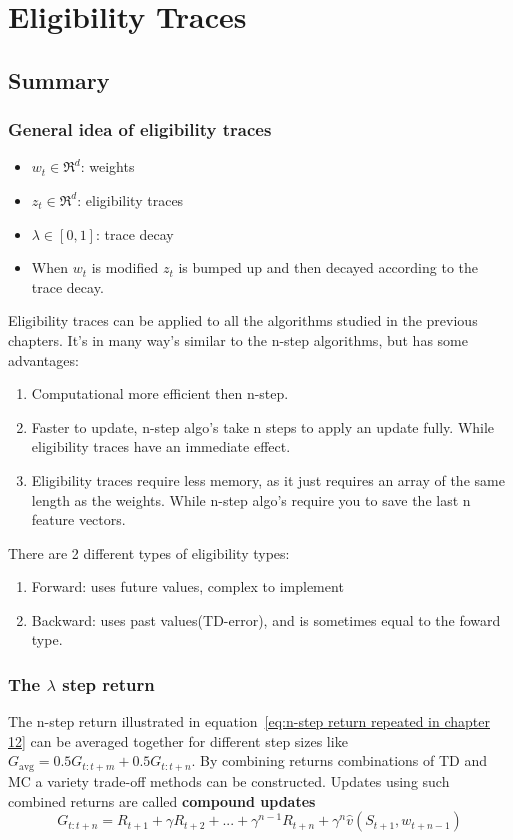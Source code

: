 \chapter{Eligibility Traces}

\section{Summary}

\subsection{General idea of eligibility traces}

\begin{itemize}
	\item $w_t \in \Re^d$: weights
	\item $z_t \in \Re^d$: eligibility traces
	\item $\lambda \in [0,1]$: trace decay 
	\item When $w_t$ is modified $z_t$ is bumped up and then decayed according to the trace decay.
\end{itemize}

Eligibility traces can be applied to all the algorithms studied in the previous chapters. It's in many way's similar to the n-step algorithms, but has some advantages:
\begin{enumerate}
	\item Computational more efficient then n-step.
	\item Faster to update, n-step algo's take n steps to apply an update fully. While eligibility traces have an immediate effect.
	\item Eligibility traces require less memory, as it just requires an array of the same length as the weights. While n-step algo's require you to save the last n feature vectors.
\end{enumerate}

There are 2 different types of eligibility types:
\begin{enumerate}
	\item Forward: uses future values, complex to implement
	\item Backward: uses past values(TD-error), and is sometimes equal to the foward type.
\end{enumerate}

\subsection{The $\lambda$ step return}
The n-step return illustrated in equation~\ref{eq:n-step return repeated in chapter 12} can be averaged together for different step sizes like $G_{\text{avg}} = 0.5G_{t:t+m} + 0.5 G_{t:t+n}$. By combining returns combinations of TD and MC a variety trade-off methods can be constructed. Updates using such combined returns are called \textbf{compound updates}
\begin{equation}
G_{t:t+n} = R_{t+1} + \gamma R_{t+2} + ... + \gamma^{n-1}R_{t+n} + \gamma^n \hat{v}(S_{t+1}, w_{t+n-1})
\label{eq:n-step return repeated in chapter 12}
\end{equation}

